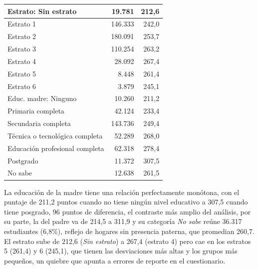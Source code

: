         {
            \small
            \tablelasttail{}
            \begin{center}
            \label{family_table}
            \begin{supertabular}{|l|r|r|}
                Estrato: Sin estrato & 19.781 & 212,6 \\ \hline
                Estrato 1 & 146.333 & 242,0 \\ \hline
                Estrato 2 & 180.091 & 253,7 \\ \hline
                Estrato 3 & 110.254 & 263,2 \\ \hline
                Estrato 4 & 28.092 & 267,4 \\ \hline
                Estrato 5 & 8.448 & 261,4 \\ \hline
                Estrato 6 & 3.879 & 245,1 \\ \hline
                Educ. madre: Ninguno & 10.260 & 211,2 \\ \hline
                Primaria completa & 42.124 & 233,4 \\ \hline
                Secundaria completa & 143.736 & 249,4 \\ \hline
                Técnica o tecnológica completa & 52.289 & 268,0 \\ \hline
                Educación profesional completa & 62.318 & 278,4 \\ \hline
                Postgrado & 11.372 & 307,5 \\ \hline
                No sabe & 12.638 & 261,5 \\ \hline
            \end{supertabular}
            \end{center}
        }

        \vspace{10pt}

        La educación de la madre tiene una relación perfectamente monótona, con el 
        puntaje de 211,2 puntos cuando no tiene ningún nivel educativo a 307,5 
        cuando tiene posgrado, 96 puntos de diferencia, el contraste más amplio 
        del análisis, por su parte, la del padre va de 214,5 a 311,9 y su categoría 
        \textit{No sabe} reúne 36.317 estudiantes (6,8\%), reflejo de hogares sin 
        presencia paterna, que promedian 260,7. El estrato sube de 212,6 
        (\textit{Sin estrato}) a 267,4 (estrato 4) pero cae en los estratos 5 
        (261,4) y 6 (245,1), que tienen las desviaciones más altas y los grupos 
        más pequeños, un quiebre que apunta a errores de reporte en el cuestionario.

